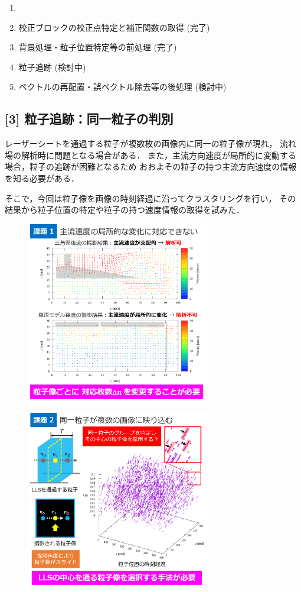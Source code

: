 \documentclass[twocolumn,a4j]{jsarticle}
\begin{document}
\begin{enumerate}[(1)]
	\item [] \textgt{[ 全体の流れ ]}
	\item 校正ブロックの校正点特定と補正関数の取得 (完了)
	\item 背景処理・粒子位置特定等の前処理 (完了)
	\item 粒子追跡 (検討中)
	\item ベクトルの再配置・誤ベクトル除去等の後処理 (検討中)
\end{enumerate}

\subsection{[3] 粒子追跡：同一粒子の判別}
レーザーシートを通過する粒子が複数枚の画像内に同一の粒子像が現れ，
流れ場の解析時に問題となる場合がある．
また，主流方向速度が局所的に変動する場合，粒子の追跡が困難となるため
おおよその粒子の持つ主流方向速度の情報を知る必要がある．

\newpage
そこで，今回は粒子像を画像の時刻経過に沿ってクラスタリングを行い，
その結果から粒子位置の特定や粒子の持つ速度情報の取得を試みた．

\begin{figure}[htbp]
	\includegraphics[keepaspectratio, width=80mm]{../images/challenge_1.png}
\end{figure}
\begin{figure}[htbp]
	\includegraphics[keepaspectratio, width=80mm]{../images/challenge_2.png}
\end{figure}
\end{document}
